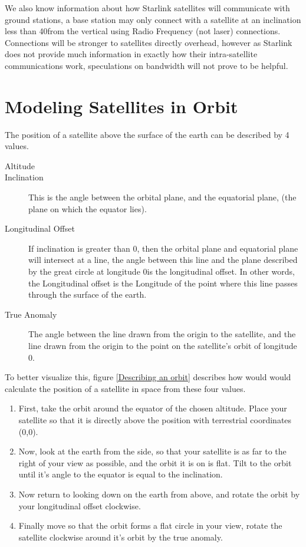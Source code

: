 \documentclass[12pt]{report}
\begin{document}
We also know information about how Starlink satellites will communicate with ground stations, a base station may only connect with a satellite at an inclination less than 40\degree from the vertical using Radio Frequency (not laser) connections. Connections will be stronger to satellites directly overhead, however as Starlink does not provide much information in exactly how their intra-satellite communications work, speculations on bandwidth will not prove to be helpful.

\section{Modeling Satellites in Orbit}

The position of a satellite above the surface of the earth can be described by 4 values. \cite{Book}

 \begin{description}
\item[Altitude]
\item[Inclination]
This is the angle between the orbital plane, and the equatorial plane, (the plane on which the equator lies).
\item[Longitudinal Offset]
If inclination is greater than 0\degree, then the orbital plane and equatorial plane will intersect at a line, the angle between this line and the plane described by the great circle at longitude 0\degree is the longitudinal offset. In other words, the Longitudinal offset is the Longitude of the point where this line passes through the surface of the earth.
\item[True Anomaly]
The angle between the line drawn from the origin to the satellite, and the line drawn from the origin to the point on the satellite's orbit of longitude 0.
\end{description}

To better visualize this, figure \ref{Describing an orbit} describes how would would calculate the position of a satellite in space from these four values.

\begin{enumerate}
\item First, take the orbit around the equator of the chosen altitude. Place your satellite so that it is directly above the position with terrestrial coordinates (0,0).
\item Now, look at the earth from the side, so that your satellite is as far to the right of your view as possible, and the orbit it is on is flat. Tilt to the orbit until it's angle to the equator is equal to the inclination.
\item Now return to looking down on the earth from above, and rotate the orbit by your longitudinal offset clockwise.
\item Finally move so that the orbit forms a flat circle in your view, rotate the satellite clockwise around it's orbit by the true anomaly.
\end{enumerate}
\end{document}
